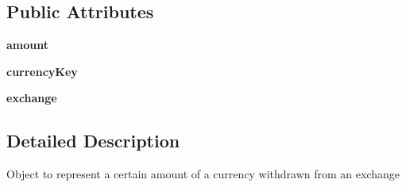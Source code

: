\subsection*{Public Attributes}
\begin{DoxyCompactItemize}
\item 
\hypertarget{class_solar_calculator_1_1_utils_1_1_py_exchange_rates_1_1_money_a6fce7ad98bc616dc360d50f56f0b4aab}{{\bfseries amount}}\label{class_solar_calculator_1_1_utils_1_1_py_exchange_rates_1_1_money_a6fce7ad98bc616dc360d50f56f0b4aab}

\item 
\hypertarget{class_solar_calculator_1_1_utils_1_1_py_exchange_rates_1_1_money_adc608b679e7030a798d6ecfa911c3b00}{{\bfseries currency\-Key}}\label{class_solar_calculator_1_1_utils_1_1_py_exchange_rates_1_1_money_adc608b679e7030a798d6ecfa911c3b00}

\item 
\hypertarget{class_solar_calculator_1_1_utils_1_1_py_exchange_rates_1_1_money_accebc212409127e64f638298a626017f}{{\bfseries exchange}}\label{class_solar_calculator_1_1_utils_1_1_py_exchange_rates_1_1_money_accebc212409127e64f638298a626017f}

\end{DoxyCompactItemize}


\subsection{Detailed Description}
\begin{DoxyVerb}Object to represent a certain amount of a currency withdrawn from an exchange \end{DoxyVerb}
 

